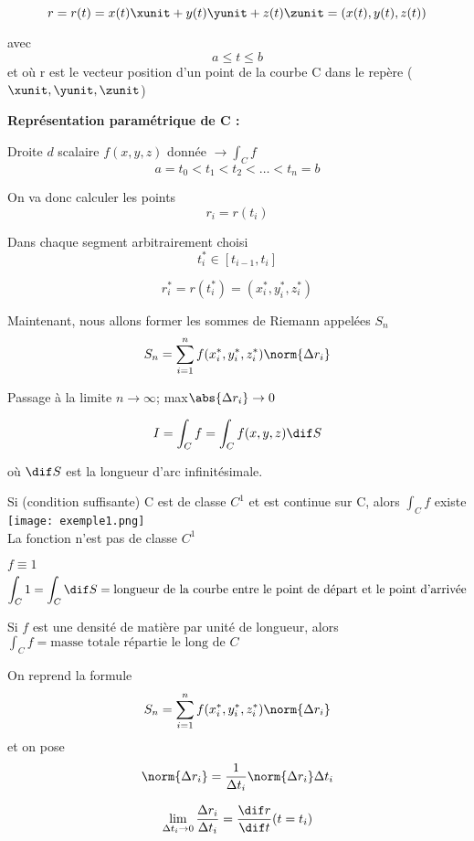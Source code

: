 \[r=r(t)=x(t)\xunit+ y(t)\yunit+z(t)\zunit = (x(t),y(t),z(t))\]

avec \[a\leq t\leq b\] et où r est le vecteur position d'un point de la courbe C dans le repère ($\xunit,\yunit, \zunit$)

\textbf{Représentation paramétrique de C :}

Droite $d$ scalaire $f(x,y,z)$ donnée $\to \int_C f$
\[a=t_0<t_1<t_2<\dots<t_n=b\]

On va donc calculer les points
\[r_i = r(t_i)\]

Dans chaque segment arbitrairement choisi
\[t_i^*\in[t_{i-1},t_i]\]

\[r_i^*=r(t_i^*)=(x_i^*,y_i^*,z_i^*)\]

Maintenant, nous allons former les sommes de Riemann appelées $S_n$
\[S_n=\sum_{i=1}^nf(x_i^*,y_i^*,z_i^*)\norm{\Delta r_i}\]

Passage à la limite $n\to\infty$; max$\abs{\Delta r_i}\to 0$

\[I=\int_C f = \int_C f (x,y,z)\dif S\]

où $\dif S$ est la longueur d'arc infinitésimale.

\begin{mytheo}
Si (condition suffisante) C est de classe $C^1$ et est continue sur C, alors $\int_C f$ existe\\
\texttt{[image: exemple1.png]}\\
La fonction n'est pas de classe $C^1$
\end{mytheo}

\begin{myrem}

$f\equiv1$
\[\int_C 1 = \int_C \dif S = \text{longueur de la courbe entre le point de départ et le point d'arrivée}\]
\end{myrem}

\begin{myrem}
Si $f$ est une densité de matière par unité de longueur, alors $\int_C f  = \text{masse totale répartie le long de }C$
\end{myrem}

On reprend la formule
\[S_n=\sum_{i=1}^nf(x_i^*,y_i^*,z_i^*)\norm{\Delta r_i}\]
 et on pose \[\norm{\Delta r_i }=\frac{1}{\Delta t_i}\norm{\Delta r_i} \Delta t_i\]


 \[\lim_{\Delta t_i \to 0} \frac{\Delta r_i}{\Delta t_i} = \frac{\dif r}{\dif t}(t=t_i)\]

\\

